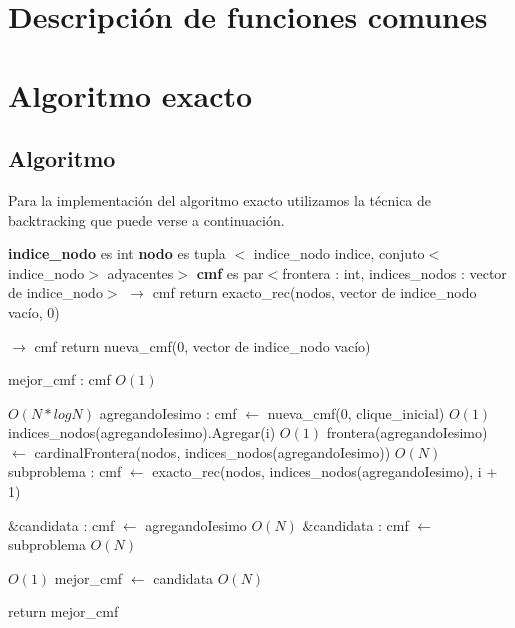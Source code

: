 \documentclass[a4paper, 10pt, twoside]{article}
\newenvironment{pseudo}[1][]{%
    \vspace{1em}%
    \begin{algorithmic}%
}
{%
    \end{algorithmic}%
    \vspace{1em}%
}
\newcommand{\Ode}[1]{\hfill $O(#1)$}
\begin{document}


\newpage
\section{Descripción de funciones comunes}





\newpage

\section{Algoritmo exacto}
\subsection{Algoritmo}
Para la implementación del algoritmo exacto utilizamos la técnica de backtracking que puede verse a continuación.

\begin{pseudo}
\State \textbf{indice\_nodo} es int
\State \textbf{nodo} es tupla $<$ indice\_nodo indice, conjuto$<$indice\_nodo$>$ adyacentes$>$
\State \textbf{cmf} es par$<$frontera : int, indices\_nodos : vector de indice\_nodo$>$
\State
{} $\rightarrow$ cmf
	\State return exacto\_rec(nodos, vector de indice\_nodo vacío, 0)
\State
\EndProcedure

 $\rightarrow$ cmf
	 return nueva\_cmf(0, vector de indice\_nodo vacío) \EndIf

	\State mejor\_cmf : cmf									\Ode{1}

		 \Ode{N * log N}
			\State agregandoIesimo : cmf $\leftarrow$ nueva\_cmf(0, clique\_inicial)	\Ode{1}
			\State indices\_nodos(agregandoIesimo).Agregar(i)	\Ode{1}
			\State frontera(agregandoIesimo) $\leftarrow$
					cardinalFrontera(nodos, indices\_nodos(agregandoIesimo))	\Ode{N}
			\State subproblema : cmf $\leftarrow$
					exacto\_rec(nodos, indices\_nodos(agregandoIesimo), i + 1)

				\State \&candidata : cmf $\leftarrow$ agregandoIesimo			\Ode{N}
			\Else 
				\State \&candidata : cmf $\leftarrow$ subproblema				\Ode{N}
			\EndIf

			 \Ode{1}
				\State mejor\_cmf $\leftarrow$ candidata	\Ode{N}
			\EndIf
		\EndIf
	\EndFor

	\State return mejor\_cmf
\EndProcedure
\end{pseudo}
\end{document}
